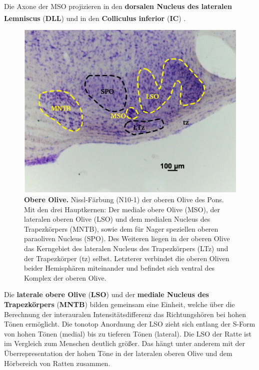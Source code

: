 Die Axone der MSO projizieren in den \textbf{dorsalen Nucleus des lateralen Lemniscus} (\textbf{DLL}) und in den \textbf{Colliculus inferior} (\textbf{IC}) \textsuperscript{\cite[Kap.~29]{paxinos2014rat}}.
\\

\begin{figure}[H]
    \centering
    \includegraphics{pictures/auditory/obere_olive.png}
    \caption[Obere Olive]{\textbf{Obere Olive.} Nissl-Färbung (N10-1) der oberen Olive des Pons. Mit den drei Hauptkernen: Der mediale obere Olive (MSO), der lateralen oberen Olive (LSO) und dem medialen Nucleus des Trapezkörpers (MNTB), sowie dem für Nager speziellen oberen paraoliven Nucleus (SPO). Des Weiteren liegen in der oberen Olive das Kerngebiet des lateralen Nucleus des Trapezkörpers (LTz) und der Trapezkörper (tz) selbst. Letzterer verbindet die oberen Oliven beider Hemisphären miteinander und befindet sich ventral des Komplex der oberen Olive.}
    \label{fig:obere_Olive}
\end{figure}

Die \textbf{laterale obere Olive} (\textbf{LSO}) und der \textbf{mediale Nucleus des Trapezkörpers} (\textbf{MNTB})  bilden gemeinsam eine Einheit, welche über die Berechnung der interauralen Intensitätsdifferenz das Richtungshören bei hohen Tönen ermöglicht. 
Die tonotop Anordnung der LSO zieht sich entlang der S-Form von hohen Tönen (medial) bis zu tieferen Tönen (lateral). Die LSO der Ratte ist im Vergleich zum Menschen deutlich größer. Das hängt unter anderem mit der Überrepresentation der hohen Töne in der lateralen oberen Olive und dem Hörbereich von Ratten zusammen.

